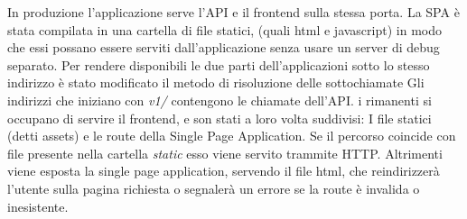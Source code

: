         In produzione l'applicazione serve l'API e il frontend sulla stessa porta.
        La SPA è stata compilata in una cartella di file statici, (quali html e javascript) in modo che essi possano essere serviti dall'applicazione senza usare un server di debug separato.
        Per rendere disponibili le due parti dell'applicazioni sotto lo stesso indirizzo è stato modificato il metodo di risoluzione delle sottochiamate
        Gli indirizzi che iniziano con \textit{v1/} contengono le chiamate dell'API.
        i rimanenti si occupano di servire il frontend, e son stati a loro volta suddivisi:
        I file statici (detti assets) e le route della Single Page Application.
        Se il percorso coincide con file presente nella cartella \textit{static} esso viene servito trammite HTTP.
        Altrimenti viene esposta la single page application, servendo il file html, che reindirizzerà l'utente sulla pagina richiesta o segnalerà un errore se la route è invalida o inesistente.